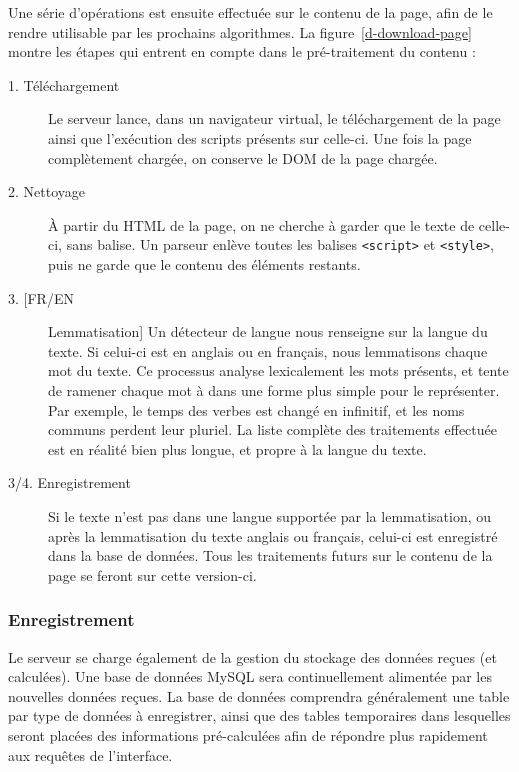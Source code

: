 				Une série d'opérations est ensuite effectuée sur le contenu de la page, afin de le rendre utilisable par les prochains algorithmes. La figure~\ref{d-download-page} montre les étapes qui entrent en compte dans le pré-traitement du contenu :

				\begin{description}
					\item[1. Téléchargement] Le serveur lance, dans un navigateur virtual, le téléchargement de la page ainsi que l'exécution des scripts présents sur celle-ci. Une fois la page complètement chargée, on conserve le DOM de la page chargée.
					\item[2. Nettoyage] À partir du HTML de la page, on ne cherche à garder que le texte de celle-ci, sans balise. Un parseur enlève toutes les balises \texttt{<script>} et \texttt{<style>}, puis ne garde que le contenu des éléments restants.
					\item[3. [FR/EN] Lemmatisation] Un détecteur de langue nous renseigne sur la langue du texte. Si celui-ci est en anglais ou en français, nous lemmatisons chaque mot du texte. Ce processus analyse lexicalement les mots présents, et tente de ramener chaque mot à dans une forme plus simple pour le représenter. Par exemple, le temps des verbes est changé en infinitif, et les noms communs perdent leur pluriel. La liste complète des traitements effectuée est en réalité bien plus longue, et propre à la langue du texte.
					\item[3/4. Enregistrement] Si le texte n'est pas dans une langue supportée par la lemmatisation, ou après la lemmatisation du texte anglais ou français, celui-ci est enregistré dans la base de données. Tous les traitements futurs sur le contenu de la page se feront sur cette version-ci.
				\end{description}

		\subsubsection{Enregistrement}

			Le serveur se charge également de la gestion du stockage des données reçues (et calculées). Une base de données MySQL sera continuellement alimentée par les nouvelles données reçues. La base de données comprendra généralement une table par type de données à enregistrer, ainsi que des tables temporaires dans lesquelles seront placées des informations pré-calculées afin de répondre plus rapidement aux requêtes de l'interface.

